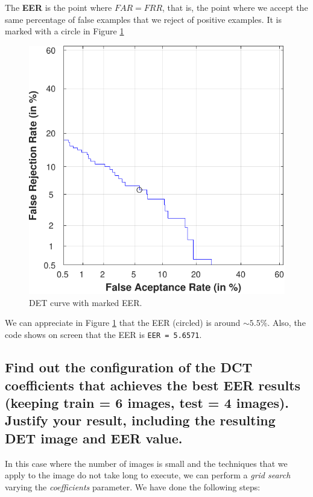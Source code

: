\documentclass[a4paper]{article}
\def\inline{\lstinline[basicstyle=\ttfamily,keywordstyle={}]}
\begin{document}
The \textbf{EER} is the point where \(FAR = FRR\), that is, the point where we accept the same percentage of false examples that we reject of positive examples. It is marked with a circle in Figure \ref{fig:ex1b}


\begin{figure}[H]
  \centering
  \includegraphics[scale=0.7]{Figures/EER-1}
    \caption{DET curve with marked EER.}
    \label{fig:ex1b}
\end{figure}

We can appreciate in Figure \ref{fig:ex1b} that the EER (circled) is around \(\sim 5.5\%\). Also, the code shows on screen that the EER is \inline{EER = 5.6571}.


\subsection{Find out the configuration of the DCT coefficients that achieves the best EER results (keeping train = 6 images, test = 4 images). Justify your result, including the resulting DET image and EER value.}

In this case where the number of images is small and the techniques that we apply to the image do not take long to execute, we can perform a \emph{grid search} varying the \emph{coefficients} parameter. We have done the following steps:
\end{document}
